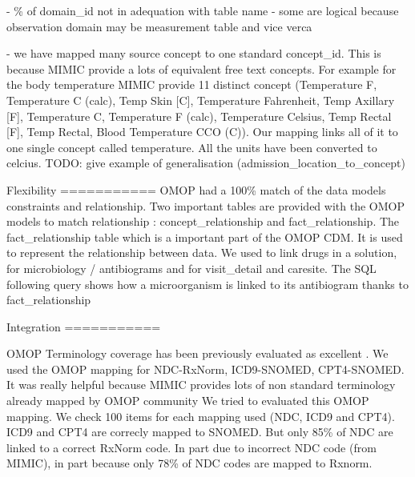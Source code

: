 - \% of domain_id not in adequation with table name 
	- some are logical because observation domain may be measurement table and vice verca

- we have mapped  many source concept to one standard concept\_id. This is because MIMIC provide a lots of equivalent free text concepts.
  For example for the body temperature MIMIC provide 11 distinct concept (Temperature F, Temperature C (calc), Temp Skin [C], Temperature Fahrenheit, Temp Axillary [F], Temperature C, Temperature F (calc), Temperature Celsius, Temp Rectal [F], Temp Rectal, Blood Temperature CCO (C)). Our mapping links all of it to one single concept called temperature. All the units have been converted to celcius.
  TODO: give example of generalisation (admission\_location\_to\_concept)

Flexibility  
===========
OMOP had a 100\% match of the data models constraints and relationship.
Two important tables are provided with the OMOP models to  match relationship : concept\_relationship and fact\_relationship.
The fact\_relationship table which is a important part of the OMOP CDM. It is used to represent the relationship between data.
We used to link drugs in a solution, for microbiology / antibiograms and for visit\_detail and caresite.
The SQL following query shows how a microorganism is linked to its antibiogram thanks to fact\_relationship

%


Integration
===========

OMOP Terminology coverage has been previously evaluated as excellent
\cite{omop-vs-pcornet}. We used the OMOP mapping for NDC-RxNorm, ICD9-SNOMED,
CPT4-SNOMED. It was really helpful because MIMIC provides lots of non standard
terminology already mapped by OMOP community
We tried to evaluated this OMOP mapping.
We check 100 items for each mapping used (NDC, ICD9 and CPT4). ICD9 and CPT4 are correcly mapped to SNOMED. But only 85\% of NDC are
linked to a correct RxNorm code. In part due to incorrect NDC code (from MIMIC), in part because only 78\% of NDC codes are mapped to Rxnorm.

